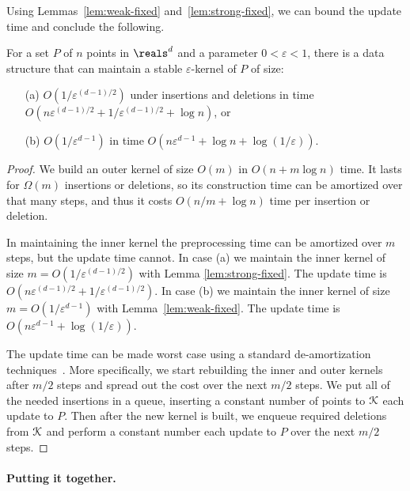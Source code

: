 \documentclass[11pt]{myclass}
\newcommand{\eps}{\varepsilon}
\def\kernel{\EuScript{K}}
\begin{document}
Using Lemmas~\ref{lem:weak-fixed} and~\ref{lem:strong-fixed}, we can
bound the update time and conclude the following.
\begin{lemma}
For a set $P$ of $n$ points in $\reals^d$ and a parameter 
$0 < \eps < 1$, there is a data structure that can maintain 
a stable $\eps$-kernel of $P$ of size:
\begin{itemize} \denselist
\item[(a)] $O(1/\eps^{(d-1)/2})$ under insertions and deletions in time 
$O(n \eps^{(d-1)/2} + 1/\eps^{(d-1)/2} + \log n)$, or
\item[(b)] $O(1/\eps^{d-1})$ in time $O(n \eps^{d-1} + \log n + \log (1/\eps))$.
\end{itemize}
\label{lem:stable-outter}
\end{lemma}

\begin{proof}
We build an outer kernel of size $O(m)$ in $O(n +  m \log n)$ time.  It lasts for $\Omega(m)$ insertions or deletions, so its construction time can be amortized over that many steps, and thus it costs $O(n/m + \log n)$ time per insertion or deletion.

In maintaining the inner kernel the preprocessing time can be amortized over $m$ steps, but the update time cannot.  
In case (a) we maintain the inner kernel of size $m = O(1/\eps^{(d-1)/2})$ with Lemma \ref{lem:strong-fixed}.  The update time is $O(n \eps^{(d-1)/2} + 1/\eps^{(d-1)/2})$.  
In case (b) we maintain the inner kernel of size $m = O(1/\eps^{d-1})$ with Lemma~\ref{lem:weak-fixed}.  The update time is $O(n \eps^{d-1} + \log (1/\eps))$.  

The update time can be made worst case using a standard de-amortization techniques~\cite{Ove83}.  More specifically, we start rebuilding the inner and outer kernels after $m/2$ steps and spread out the cost over the next $m/2$ steps.  We put all of the needed insertions in a queue, inserting a constant number of points to $\kernel$ each update to $P$.  Then after the new kernel is built, we enqueue required deletions from $\kernel$ and perform a constant number each update to $P$ over the next $m/2$ steps.  
\end{proof}

\paragraph{Putting it together.}
\end{document}
